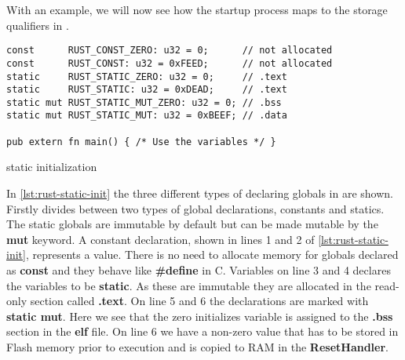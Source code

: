 With an example, we will now see how the startup process maps to the storage qualifiers in \rust.
\begin{listing}[H]
\begin{verbatim}
const      RUST_CONST_ZERO: u32 = 0;      // not allocated
const      RUST_CONST: u32 = 0xFEED;      // not allocated
static     RUST_STATIC_ZERO: u32 = 0;     // .text
static     RUST_STATIC: u32 = 0xDEAD;     // .text
static mut RUST_STATIC_MUT_ZERO: u32 = 0; // .bss
static mut RUST_STATIC_MUT: u32 = 0xBEEF; // .data

pub extern fn main() { /* Use the variables */ }
\end{verbatim}
\caption{\rust static initialization}
\label{lst:rust-static-init}
\end{listing}
In \autoref{lst:rust-static-init} the three different types of declaring globals in \rust are shown.
Firstly \rust divides between two types of global declarations, constants and statics.
The static globals are immutable by default but can be made mutable by the \textbf{mut} keyword.
A constant declaration, shown in lines 1 and 2 of \autoref{lst:rust-static-init}, represents a value.
There is no need to allocate memory for globals declared as \textbf{const} and they behave like \textbf{\#define} in C. 
Variables on line 3 and 4 declares the variables to be \textbf{static}.
As these are immutable they are allocated in the read-only section called \textbf{.text}.
On line 5 and 6 the declarations are marked with \textbf{static mut}.
Here we see that the zero initializes variable is assigned to the \textbf{.bss} section in the \textbf{elf} file.
On line 6 we have a non-zero value that has to be stored in Flash memory prior to execution and is copied to RAM in the \textbf{ResetHandler}.
